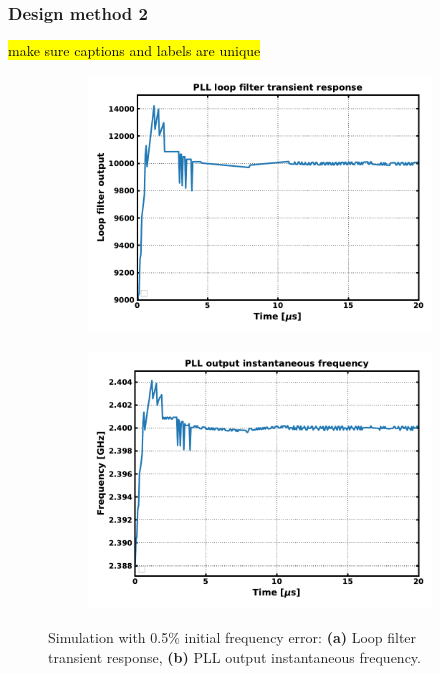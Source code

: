 \subsubsection{Design method 2}
\hl{make sure captions and labels are unique}
	\begin{figure}[htb!]
	    \centering
	    \begin{subfigure}{0.5\textwidth}
	        \centering
	        \center\includegraphics[width=1.0\textwidth, angle=0]{figs/trans_loop_filter_fast.pdf}
	        \caption{ }
	        \label{fig:trans_lf_fast}
	    \end{subfigure}%
	    \begin{subfigure}{0.5\textwidth}
	        \centering
	        \center\includegraphics[width=1.0\textwidth, angle=0]{figs/trans_inst_freq_fast.pdf}
	        \caption{ }
	        \label{fig:trans_inst_freq_fast}
	    \end{subfigure}
	    \label{fig:trans_sim1_fast}
	    \caption{Simulation with 0.5\% initial frequency error: \textbf{(a)} Loop filter transient response, \textbf{(b)} PLL output instantaneous frequency.}
	\end{figure}

